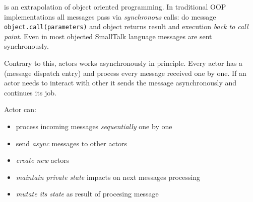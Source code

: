 
 is an extrapolation of object oriented programming. In
traditional OOP implementations all messages pass via \emph{synchronous} calls:
do message \verb|object.call(parameters)| and object returns result and
execution \emph{back to call point}. Even in most objected SmallTalk
language messages are sent synchronously.

Contrary to this, actors works asynchronously in principle. Every actor has a
 (message dispatch entry) and process every message received one
by one. If an actor needs to interact with other it sends the message
asynchronously and continues its job.

Actor can:
\begin{itemize}[nosep]
  \item process incoming messages \emph{sequentially} one by one
  \item send \emph{async} messages to other actors
  \item \emph{create new} actors
  \item \emph{maintain private state} impacts on next messages processing
  \item \emph{mutate its state} as result of procesing message
\end{itemize}
